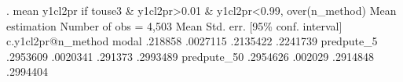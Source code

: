 . mean y1cl2pr if touse3 \& y1cl2pr>0.01 \& y1cl2pr<0.99, over(n_method)
{\smallskip}
Mean estimation                                Number of obs = 4,503
{\smallskip}
                   {\VBAR}       Mean   Std. err.     [95\% conf. interval]
c.y1cl2pr@n_method {\VBAR}
            modal  {\VBAR}    .218858   .0027115      .2135422    .2241739
       predpute_5  {\VBAR}   .2953609   .0020341       .291373    .2993489
      predpute_50  {\VBAR}   .2954626    .002029      .2914848    .2994404
